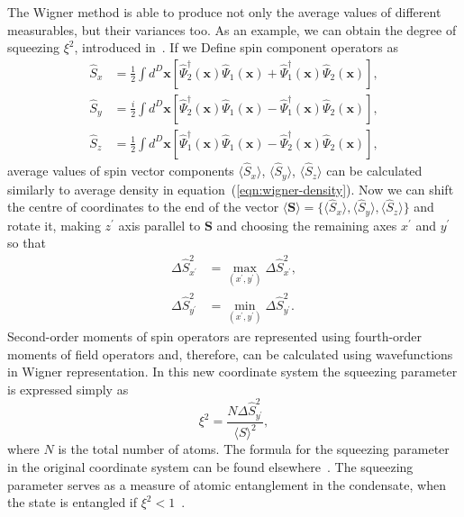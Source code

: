 \documentclass[aps,prl,twocolumn,showpacs,amsmath,amssymb,superscriptaddress,flushbottom,noraggedfooter]{revtex4-1}
\newcommand{\xvec}{\boldsymbol{x}}
\begin{document}
The Wigner method is able to produce not only the average values of different measurables,
but their variances too.
As an example, we can obtain the degree of squeezing $\xi^2$, introduced in~\cite{Wineland1994,Sorensen2001}.
If we Define spin component operators as
\begin{equation}
\begin{split}
	\hat{S}_x & = \frac{1}{2} \int d^D\xvec \left[
		\widehat{\Psi}^\dagger_2 (\xvec) \widehat{\Psi}_1 (\xvec)
		+ \widehat{\Psi}^\dagger_1 (\xvec) \widehat{\Psi}_2 (\xvec)
	\right], \\
	\hat{S}_y & = \frac{i}{2} \int d^D\xvec \left[
		\widehat{\Psi}^\dagger_2 (\xvec) \widehat{\Psi}_1 (\xvec)
		- \widehat{\Psi}^\dagger_1 (\xvec) \widehat{\Psi}_2 (\xvec)
	\right], \\
	\hat{S}_z & = \frac{1}{2} \int d^D\xvec \left[
		\widehat{\Psi}^\dagger_1 (\xvec) \widehat{\Psi}_1 (\xvec)
		- \widehat{\Psi}^\dagger_2 (\xvec) \widehat{\Psi}_2 (\xvec)
	\right],
\end{split}
\end{equation}
average values of spin vector components $\langle \hat{S}_x \rangle$, $\langle \hat{S}_y \rangle$,
$\langle \hat{S}_z \rangle$ can be calculated similarly to average density in
equation~(\ref{eqn:wigner-density}).
Now we can shift the centre of coordinates to the end of the vector
$\langle \boldsymbol{S} \rangle = \{ \langle \hat{S}_x \rangle, \langle \hat{S}_y \rangle, \langle \hat{S}_z \rangle \}$
and rotate it, making $z^\prime$ axis parallel to $\boldsymbol{S}$ and choosing the remaining axes $x^\prime$ and $y^\prime$ so that
\begin{equation}
\begin{split}
	\Delta \hat{S}^2_{x^\prime} & = \max\limits_{(x^\prime,y^\prime)} \Delta \hat{S}^2_{x^\prime}, \\
	\Delta \hat{S}^2_{y^\prime} & = \min\limits_{(x^\prime,y^\prime)} \Delta \hat{S}^2_{y^\prime}.
\end{split}
\end{equation}
Second-order moments of spin operators are represented using fourth-order moments of field operators
and, therefore, can be calculated using wavefunctions in Wigner representation.
In this new coordinate system the squeezing parameter is expressed simply as
\begin{equation}
\label{eqn:squeezing}
	\xi^2 = \frac{N \Delta \hat{S}^2_{y^\prime}}{\langle S \rangle^2},
\end{equation}
where $N$ is the total number of atoms.
The formula for the squeezing parameter in the original coordinate system can be found elsewhere~\cite{Li2009}.
The squeezing parameter serves as a measure of atomic entanglement in the condensate,
when the state is entangled if $\xi^2 < 1$~\cite{Sorensen2001}.
\end{document}

